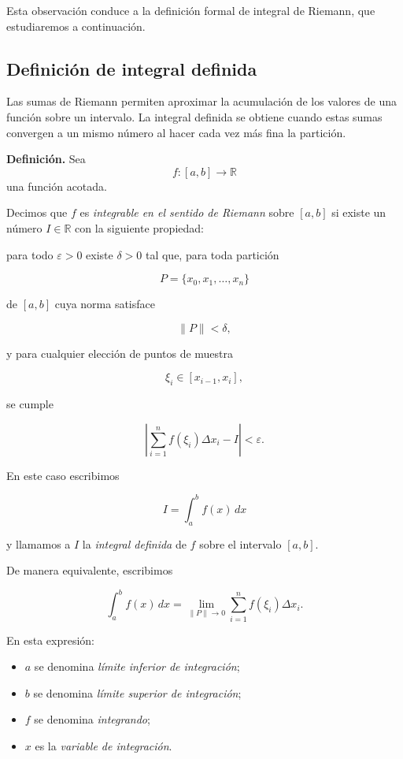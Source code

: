 \documentclass[12pt]{article}
\begin{document}
Esta observación conduce a la definición formal de integral de Riemann,
que estudiaremos a continuación.

\subsection{Definición de integral definida}

Las sumas de Riemann permiten aproximar la acumulación de los valores de
una función sobre un intervalo. La integral definida se obtiene cuando
estas sumas convergen a un mismo número al hacer cada vez más fina la
partición.

\textbf{Definición.}
Sea
\[
f:[a,b]\longrightarrow\mathbb{R}
\]
una función acotada.

Decimos que $f$ es \emph{integrable en el sentido de Riemann} sobre
$[a,b]$ si existe un número $I\in\mathbb{R}$ con la siguiente propiedad:

para todo $\varepsilon>0$ existe $\delta>0$ tal que, para toda partición

\[
P=\{x_0,x_1,\ldots,x_n\}
\]

de $[a,b]$ cuya norma satisface

\[
\|P\|<\delta,
\]

y para cualquier elección de puntos de muestra

\[
\xi_i\in[x_{i-1},x_i],
\]

se cumple

\[
\left|
\sum_{i=1}^{n}f(\xi_i)\Delta x_i-I
\right|
<\varepsilon.
\]

En este caso escribimos

\[
\boxed{
I=\int_a^b f(x)\,dx
}
\]

y llamamos a $I$ la \emph{integral definida} de $f$ sobre el intervalo
$[a,b]$.

De manera equivalente, escribimos

\[
\boxed{
\int_a^b f(x)\,dx
=
\lim_{\|P\|\to0}
\sum_{i=1}^{n}f(\xi_i)\Delta x_i.
}
\]

En esta expresión:

\begin{itemize}
    \item $a$ se denomina \emph{límite inferior de integración};
    \item $b$ se denomina \emph{límite superior de integración};
    \item $f$ se denomina \emph{integrando};
    \item $x$ es la \emph{variable de integración}.
\end{itemize}
\end{document}
